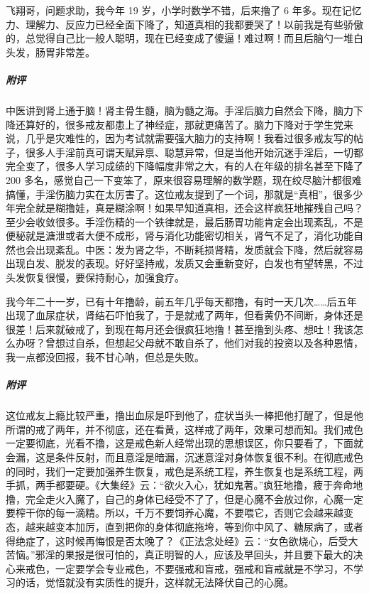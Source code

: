 \begin{case}
    飞翔哥，问题求助，我今年 19 岁，小学时数学不错，后来撸了 6 年多。现在记忆力、理解力、反应力已经全面下降了，知道真相的我都要哭了！以前我是有些骄傲的，总觉得自己比一般人聪明，现在已经变成了傻逼！难过啊！而且后脑勺一堆白头发，肠胃非常差。
    \subparagraph{附评} 中医讲到肾上通于脑！肾主骨生髓，脑为髓之海。手淫后脑力自然会下降，脑力下降还算好的，很多戒友都患上了神经症，那就更痛苦了。脑力下降对于学生党来说，几乎是灾难性的，因为考试就需要强大脑力的支持啊！我看过很多戒友写的帖子，很多人手淫前真可谓天赋异禀、聪慧异常，但是当他开始沉迷手淫后，一切都完全变了，很多人学习成绩的下降幅度非常之大，有的人在年级的排名甚至下降了 200 多名，感觉自己一下变笨了，原来很容易理解的数学题，现在绞尽脑汁都很难搞懂，手淫伤脑力实在太厉害了。这位戒友提到了一个词，那就是“真相”，很多少年完全就是糊撸娃，真是糊涂啊！如果早知道真相，还会这样疯狂地摧残自己吗？至少会收敛很多。手淫伤精的一个铁律就是，最后肠胃功能肯定会出现紊乱，不是便秘就是溏泄或者大便不成形，肾与消化功能密切相关，肾气不足了，消化功能自然也会出现紊乱。中医：发为肾之华，不断耗损肾精，发质就会下降，然后就容易出现白发、脱发的表现。好好坚持戒，发质又会重新变好，白发也有望转黑，不过头发恢复很慢，要保持耐心，加强食疗。
\end{case}

\begin{case}
    我今年二十一岁，已有十年撸龄，前五年几乎每天都撸，有时一天几次……后五年出现了血尿症状，肾结石吓怕我了，于是就戒了两年，但看黄仍不间断，身体还是很差！后来就破戒了，到现在每月还会很疯狂地撸！甚至撸到头疼、想吐！我该怎么办呀？曾想过自杀，但想起父母就不敢自杀了，他们对我的投资以及各种恩情，我一点都没回报，我不甘心呐，但总是失败。
    \subparagraph{附评} 这位戒友上瘾比较严重，撸出血尿是吓到他了，症状当头一棒把他打醒了，但是他所谓的戒了两年，并不彻底，还在看黄，这样戒了两年，效果可想而知。我们戒色一定要彻底，光看不撸，这是戒色新人经常出现的思想误区，你只要看了，下面就会漏，这是条件反射，而且意淫是暗漏，沉迷意淫对身体恢复很不利。在彻底戒色的同时，我们一定要加强养生恢复，戒色是系统工程，养生恢复也是系统工程，两手抓，两手都要硬。《大集经》云：“欲火入心，犹如鬼著。”疯狂地撸，疲于奔命地撸，完全走火入魔了，自己的身体已经受不了了，但是心魔不会放过你，心魔一定要榨干你的每一滴精。所以，千万不要饲养心魔，不要喂它，否则它会越来越变态，越来越变本加厉，直到把你的身体彻底拖垮，等到你中风了、糖尿病了，或者得绝症了，这时候再悔恨是否太晚了？《正法念处经》云：“女色欲烧心，后受大苦恼。”邪淫的果报是很可怕的，真正明智的人，应该及早回头，并且要下最大的决心来戒色，一定要学会专业戒色，不要强戒和盲戒，强戒和盲戒就是不学习，不学习的话，觉悟就没有实质性的提升，这样就无法降伏自己的心魔。
\end{case}

